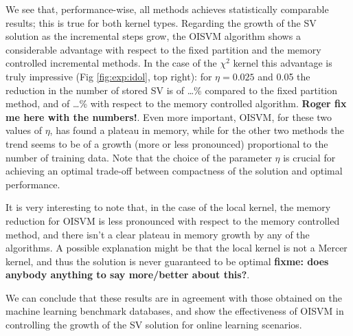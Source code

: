 We see that, performance-wise, all methods achieves statistically comparable results; this
is true for both kernel types. Regarding the growth of the SV solution as the incremental
steps grow, the OISVM algorithm shows a considerable advantage with respect to the fixed partition
and the memory controlled incremental methods. In the case of the $\chi^{2}$
kernel this advantage is truly impressive (Fig \ref{fig:exp:idol}, top right): for $\eta=0.025$ 
and 0.05 the reduction in the number of stored SV is of \ldots \% compared to the fixed partition
method, and of \ldots \% with respect to the memory controlled algorithm.
\textbf{Roger fix me here with the numbers!}. Even more important, OISVM, for these two 
values of $\eta$, has found a plateau in memory, while for the other two methods
the trend seems to be of a growth (more or less pronounced) proportional to 
the number of training data. Note that the choice of the parameter $\eta$ is crucial for
achieving an optimal trade-off between compactness of the solution and optimal performance.  

It is very interesting to note that, in the case of the local kernel, the memory reduction
for OISVM is less pronounced with respect to the memory controlled method, and there isn't a clear 
plateau in memory growth by any of the algorithms. A possible explanation
might be that the local kernel is not a Mercer kernel, and thus the solution is never guaranteed to 
be optimal \textbf{fixme: does anybody anything to say more/better about this?}.

We can conclude that these results are in agreement with those obtained on the
machine learning benchmark databases, and show the effectiveness of OISVM in
controlling the growth of the SV solution for online learning scenarios.



